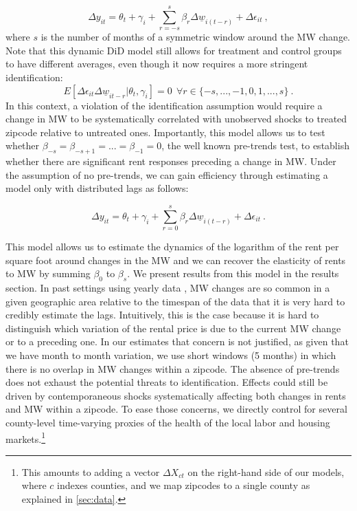 \begin{equation}\label{eq:leads_lags}
    \Delta y_{it} = \theta_t + \gamma_i + \sum_{r=-s}^{s}\beta_r \Delta \underline{w}_{i(t-r)} 
    				+ \Delta \epsilon_{it} \ ,
\end{equation}
where $s$ is the number of months of a symmetric window around the MW change. Note that this 
dynamic DiD model still allows for treatment and control groups to have different averages, even though 
it now requires a more stringent identification: 
\[E \left[ \Delta \epsilon_{it} \Delta \underline{w}_{it-r} \big| \theta_{t}, \gamma_{i} \right] = 0
	\ \ \forall r\in\{-s, ..., -1, 0, 1, ..., s\} \ . \] 
In this context, a violation of the identification assumption would require a change in MW to be 
systematically correlated with unobserved shocks to treated zipcode relative to untreated ones. 
Importantly, this model allows us to test whether $\beta_{-s} = \beta_{-s+1} = ... = \beta_{-1} = 0$, 
the well known pre-trends test, to establish whether there are significant rent responses preceding 
a change in MW. Under the assumption of no pre-trends, we can gain efficiency through estimating a 
model only with distributed lags as follows:

\begin{equation}\label{eq:lags}
        \Delta y_{it} = \theta_t + \gamma_i 
        		+ \sum_{r=0}^{s}\beta_r \Delta \underline{w}_{i(t-r)} 
        		+ \Delta \epsilon_{it} \ .
\end{equation}

This model allows us to estimate the dynamics of the logarithm of the rent per square foot around 
changes in the MW and we can recover the elasticity of rents to MW by summing $\beta_0$ to 
$\beta_{s}$. We present results from this model in the results section. In past settings using 
yearly data \parencite{Tidemann2018, Yamagishi2019}, MW changes are so common in a given 
geographic area relative to the timespan of the data that it is very hard to credibly estimate the 
lags. Intuitively, this is the case because it is hard to distinguish which variation of the rental 
price is due to the current MW change or to a preceding one. In our estimates that concern is not 
justified, as given that we have month to month variation, we use short windows (5 months) in which 
there is no overlap in MW changes within a zipcode. The absence of pre-trends does not exhaust the 
potential threats to identification. Effects could still be driven by contemporaneous shocks 
systematically affecting both changes in rents and MW within a zipcode. To ease those concerns, we 
directly control for several county-level time-varying proxies of the health of the local labor and 
housing markets.\footnote{This amounts to adding a vector $\Delta X_{ct}$ on the right-hand side of 
	our models, where $c$ indexes counties, and we map zipcodes to a single county as explained in 
	\autoref{sec:data}.}

